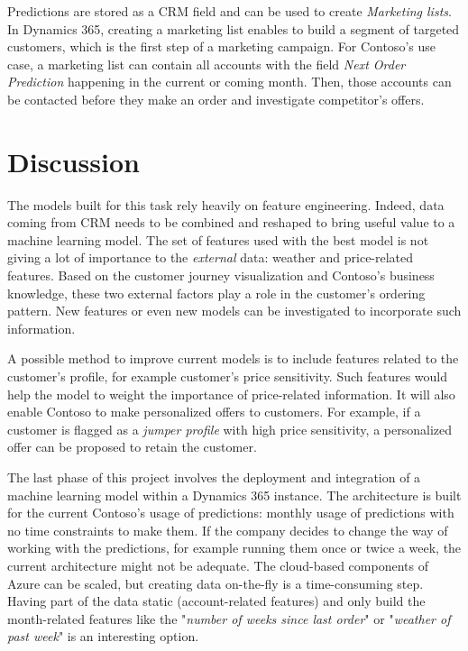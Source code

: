 Predictions are stored as a CRM field and can be used to create \textit{Marketing lists}. In Dynamics 365, creating a marketing list enables to build a segment of targeted customers, which is the first step of a marketing campaign. For Contoso's use case, a marketing list can contain all accounts with the field \textit{Next Order Prediction} happening in the current or coming month. Then, those accounts can be contacted before they make an order and investigate competitor's offers.


\section{Discussion} \label{sec:use-case-further-work}
The models built for this task rely heavily on feature engineering. Indeed, data coming from CRM needs to be combined and reshaped to bring useful value to a machine learning model. The set of features used with the best model is not giving a lot of importance to the \textit{external} data: weather and price-related features. Based on the customer journey visualization and Contoso's business knowledge, these two external factors play a role in the customer's ordering pattern. New features or even new models can be investigated to incorporate such information.

A possible method to improve current models is to include features related to the customer's profile, for example customer's price sensitivity. Such features would help the model to weight the importance of price-related information. It will also enable Contoso to make personalized offers to customers. For example, if a customer is flagged as a \textit{jumper profile} with high price sensitivity, a personalized offer can be proposed to retain the customer.

The last phase of this project involves the deployment and integration of a machine learning model within a Dynamics 365 instance. The architecture is built for the current Contoso's usage of predictions: monthly usage of predictions with no time constraints to make them. If the company decides to change the way of working with the predictions, for example running them once or twice a week, the current architecture might not be adequate. The cloud-based components of Azure can be scaled, but creating data on-the-fly is a time-consuming step. Having part of the data static (account-related features) and only build the month-related features like the "\textit{number of weeks since last order}" or "\textit{weather of past week}" is an interesting option.

